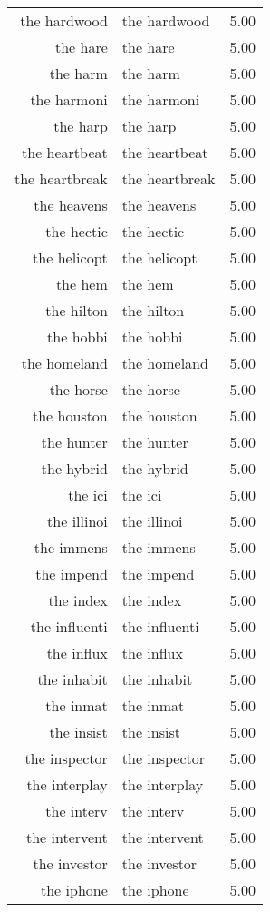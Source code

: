 \begin{table}[ht]
\begin{tabular}{rlr}
  the hardwood & the hardwood & 5.00 \\ 
  the hare & the hare & 5.00 \\ 
  the harm & the harm & 5.00 \\ 
  the harmoni & the harmoni & 5.00 \\ 
  the harp & the harp & 5.00 \\ 
  the heartbeat & the heartbeat & 5.00 \\ 
  the heartbreak & the heartbreak & 5.00 \\ 
  the heavens & the heavens & 5.00 \\ 
  the hectic & the hectic & 5.00 \\ 
  the helicopt & the helicopt & 5.00 \\ 
  the hem & the hem & 5.00 \\ 
  the hilton & the hilton & 5.00 \\ 
  the hobbi & the hobbi & 5.00 \\ 
  the homeland & the homeland & 5.00 \\ 
  the horse & the horse & 5.00 \\ 
  the houston & the houston & 5.00 \\ 
  the hunter & the hunter & 5.00 \\ 
  the hybrid & the hybrid & 5.00 \\ 
  the ici & the ici & 5.00 \\ 
  the illinoi & the illinoi & 5.00 \\ 
  the immens & the immens & 5.00 \\ 
  the impend & the impend & 5.00 \\ 
  the index & the index & 5.00 \\ 
  the influenti & the influenti & 5.00 \\ 
  the influx & the influx & 5.00 \\ 
  the inhabit & the inhabit & 5.00 \\ 
  the inmat & the inmat & 5.00 \\ 
  the insist & the insist & 5.00 \\ 
  the inspector & the inspector & 5.00 \\ 
  the interplay & the interplay & 5.00 \\ 
  the interv & the interv & 5.00 \\ 
  the intervent & the intervent & 5.00 \\ 
  the investor & the investor & 5.00 \\ 
  the iphone & the iphone & 5.00 \\ 

\end{tabular}
\end{table}
